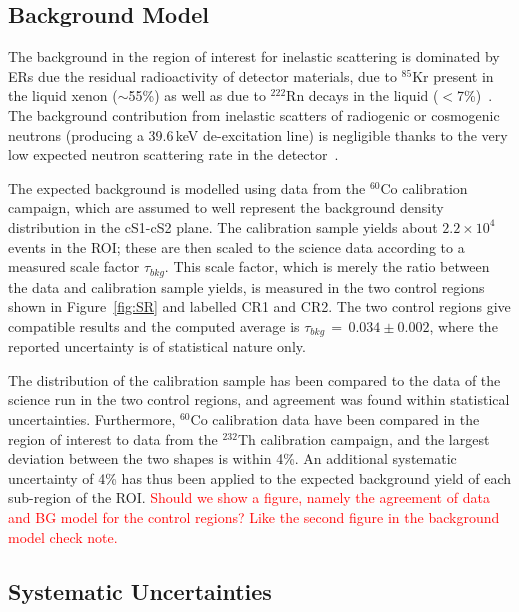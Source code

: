 {\subsection {Background Model}

The background in the region of interest for inelastic scattering is dominated by ERs due the residual radioactivity of detector materials, due to $^{85}$Kr present in the liquid xenon ($\sim$55\%) as well as due to $^{222}$Rn decays in the liquid ($<$7\%)~\cite{Aprile:2011vb}. The background contribution from inelastic scatters of radiogenic or cosmogenic neutrons (producing a 39.6\,keV de-excitation line) is negligible thanks to the very low expected neutron scattering rate in the detector~\cite{Aprile:2013tov}.


The expected background is modelled using data from the $^{60}$Co calibration campaign, which are assumed to well represent the background density distribution 
in the cS1-cS2 plane. The calibration sample yields  about $2.2\times10^4$ events in the ROI; these are then scaled to the science data according to a measured scale 
factor $\tau_{bkg}$. This scale factor, which is merely the ratio between the data and calibration sample yields, is measured in the two control regions shown in Figure~\ref{fig:SR} and labelled CR1 and CR2. The two control 
regions give compatible results and the computed average is $\tau_{bkg} \, =  \, 0.034 \pm 0.002 $, where the reported uncertainty 
is of statistical nature only.

The distribution of the calibration sample has been compared to the data of the science run in the two control regions,
and agreement was found within statistical uncertainties. Furthermore, $^{60}$Co calibration data have been compared in the region of interest to  
data from the $^{232}$Th calibration campaign, and the largest deviation between the two shapes is within 4\%. An additional systematic
uncertainty of 4\% has thus been applied to the expected background yield of each sub-region of the ROI.
{\textcolor{red} {Should we show a figure, namely the agreement of data and BG model for the control regions? Like the second figure in the background model check note.}}



\subsection{Systematic Uncertainties}

}
